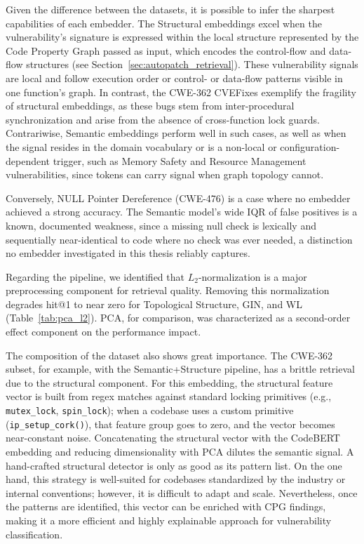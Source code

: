 Given the difference between the datasets, it is possible to infer the sharpest capabilities of each embedder. 
The Structural embeddings excel when the vulnerability's signature is expressed within the local structure represented by the Code Property Graph passed as input, which encodes the control-flow and data-flow structures (see Section~\ref{sec:autopatch_retrieval}).
These vulnerability signals are local and follow execution order or control- or data-flow patterns visible in one function's graph. 
In contrast, the CWE-362 CVEFixes exemplify the fragility of structural embeddings, as these bugs stem from inter-procedural synchronization and arise from the absence of cross-function lock guards.
Contrariwise, Semantic embeddings perform well in such cases, as well as when the signal resides in the domain vocabulary or is a non-local or configuration-dependent trigger, such as Memory Safety and Resource Management vulnerabilities, since tokens can carry signal when graph topology cannot.


Conversely, NULL Pointer Dereference (CWE-476) is a case where no embedder achieved a strong accuracy. The Semantic model's wide IQR of false positives is a known, documented weakness, since a missing null check is lexically and sequentially near-identical to code where no check was ever needed, a distinction no embedder investigated in this thesis reliably captures.

Regarding the pipeline, we identified that $L_2$-normalization is a major preprocessing component for retrieval quality. Removing this normalization degrades hit@1 to near zero for Topological Structure, GIN, and WL (Table~\ref{tab:pca_l2}). PCA, for comparison, was characterized as a second-order effect component on the performance impact. 

The composition of the dataset also shows great importance. The CWE-362 subset, for example, with the Semantic+Structure pipeline, has a brittle retrieval due to the structural component. For this embedding, the structural feature vector is built from regex matches against standard locking primitives (e.g., \texttt{mutex\_lock}, \texttt{spin\_lock}); when a codebase uses a custom primitive (\texttt{ip\_setup\_cork()}), that feature group goes to zero, and the vector becomes near-constant noise. Concatenating the structural vector with the CodeBERT embedding and reducing dimensionality with PCA dilutes the semantic signal. 
A hand-crafted structural detector is only as good as its pattern list.
On the one hand, this strategy is well-suited for codebases standardized by the industry or internal conventions; however, it is difficult to adapt and scale. 
Nevertheless, once the patterns are identified, this vector can be enriched with CPG findings, making it a more efficient and highly explainable approach for vulnerability classification.

